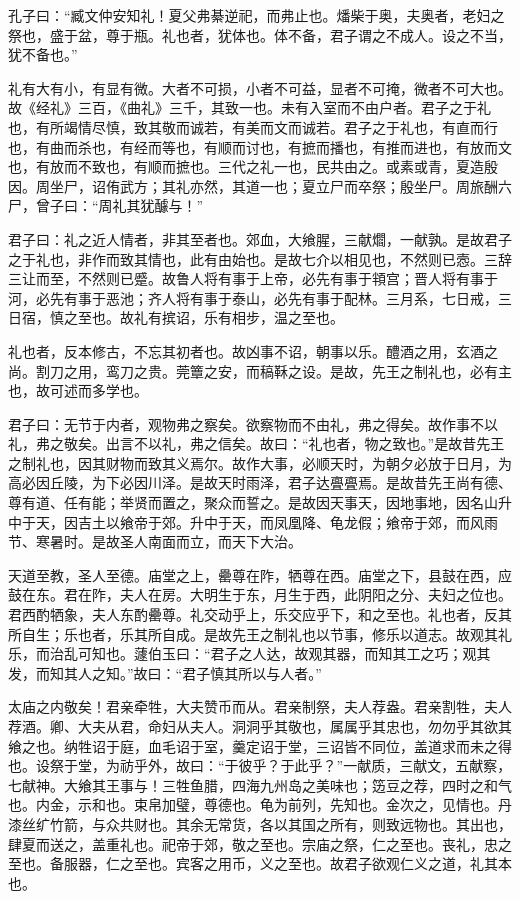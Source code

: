 \documentclass[]{article}
\begin{document}
孔子曰：``臧文仲安知礼！夏父弗綦逆祀，而弗止也。燔柴于奥，夫奥者，老妇之祭也，盛于盆，尊于瓶。礼也者，犹体也。体不备，君子谓之不成人。设之不当，犹不备也。''

礼有大有小，有显有微。大者不可损，小者不可益，显者不可掩，微者不可大也。故《经礼》三百，《曲礼》三千，其致一也。未有入室而不由户者。君子之于礼也，有所竭情尽慎，致其敬而诚若，有美而文而诚若。君子之于礼也，有直而行也，有曲而杀也，有经而等也，有顺而讨也，有摭而播也，有推而进也，有放而文也，有放而不致也，有顺而摭也。三代之礼一也，民共由之。或素或青，夏造殷因。周坐尸，诏侑武方；其礼亦然，其道一也；夏立尸而卒祭；殷坐尸。周旅酬六尸，曾子曰：``周礼其犹醵与！''

君子曰：礼之近人情者，非其至者也。郊血，大飨腥，三献爓，一献孰。是故君子之于礼也，非作而致其情也，此有由始也。是故七介以相见也，不然则已悫。三辞三让而至，不然则已蹙。故鲁人将有事于上帝，必先有事于頖宫；晋人将有事于河，必先有事于恶池；齐人将有事于泰山，必先有事于配林。三月系，七日戒，三日宿，慎之至也。故礼有摈诏，乐有相步，温之至也。

礼也者，反本修古，不忘其初者也。故凶事不诏，朝事以乐。醴酒之用，玄酒之尚。割刀之用，鸾刀之贵。莞簟之安，而稿鞂之设。是故，先王之制礼也，必有主也，故可述而多学也。

君子曰：无节于内者，观物弗之察矣。欲察物而不由礼，弗之得矣。故作事不以礼，弗之敬矣。出言不以礼，弗之信矣。故曰：``礼也者，物之致也。''是故昔先王之制礼也，因其财物而致其义焉尔。故作大事，必顺天时，为朝夕必放于日月，为高必因丘陵，为下必因川泽。是故天时雨泽，君子达亹亹焉。是故昔先王尚有德、尊有道、任有能；举贤而置之，聚众而誓之。是故因天事天，因地事地，因名山升中于天，因吉土以飨帝于郊。升中于天，而凤凰降、龟龙假；飨帝于郊，而风雨节、寒暑时。是故圣人南面而立，而天下大治。

天道至教，圣人至德。庙堂之上，罍尊在阼，牺尊在西。庙堂之下，县鼓在西，应鼓在东。君在阼，夫人在房。大明生于东，月生于西，此阴阳之分、夫妇之位也。君西酌牺象，夫人东酌罍尊。礼交动乎上，乐交应乎下，和之至也。礼也者，反其所自生；乐也者，乐其所自成。是故先王之制礼也以节事，修乐以道志。故观其礼乐，而治乱可知也。蘧伯玉曰：``君子之人达，故观其器，而知其工之巧；观其发，而知其人之知。''故曰：``君子慎其所以与人者。''

太庙之内敬矣！君亲牵牲，大夫赞币而从。君亲制祭，夫人荐盎。君亲割牲，夫人荐酒。卿、大夫从君，命妇从夫人。洞洞乎其敬也，属属乎其忠也，勿勿乎其欲其飨之也。纳牲诏于庭，血毛诏于室，羹定诏于堂，三诏皆不同位，盖道求而未之得也。设祭于堂，为祊乎外，故曰：``于彼乎？于此乎？''一献质，三献文，五献察，七献神。大飨其王事与！三牲鱼腊，四海九州岛之美味也；笾豆之荐，四时之和气也。内金，示和也。束帛加璧，尊德也。龟为前列，先知也。金次之，见情也。丹漆丝纩竹箭，与众共财也。其余无常货，各以其国之所有，则致远物也。其出也，肆夏而送之，盖重礼也。祀帝于郊，敬之至也。宗庙之祭，仁之至也。丧礼，忠之至也。备服器，仁之至也。宾客之用币，义之至也。故君子欲观仁义之道，礼其本也。
\end{document}
